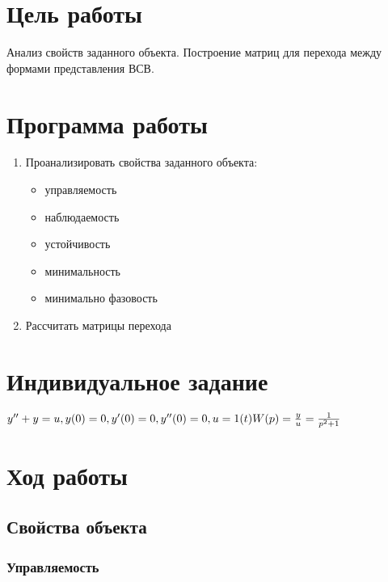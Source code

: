 



\def\contentsname{Содержание}




\section{Цель работы}

Анализ свойств заданного объекта. Построение матриц для перехода между формами представления ВСВ.

\section{Программа работы}

\begin{enumerate}
	\item Проанализировать свойства заданного объекта:
\begin{itemize}
\item управляемость
\item наблюдаемость
\item устойчивость
\item минимальность
\item минимально фазовость
\end{itemize}
\item Рассчитать матрицы перехода

\end{enumerate}

\section{Индивидуальное задание}
$
y''+ y=u, y(0)=0, y'(0)=0,y''(0)=0, u=1(t)\\\\
W(p)=\frac{y}{u}=\frac{1}{p^2+1}
$
\section{Ход работы}
\subsection{Свойства объекта}

\subsubsection{Управляемость}

